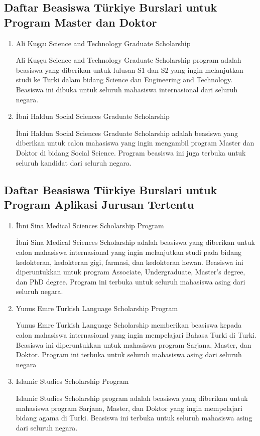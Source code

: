 \subsection{Daftar Beasiswa Türkiye Burslari untuk Program Master dan Doktor}

\begin{enumerate}
\item Ali Kuşçu Science and Technology Graduate Scholarship

Ali Kuşçu Science and Technology Graduate Scholarship program adalah beasiswa yang diberikan untuk lulusan S1 dan S2 yang ingin melanjutkan studi ke Turki dalam bidang Science dan Engineering and Technology. Beasiswa ini dibuka untuk seluruh mahasiswa internasional dari seluruh negara.

\item İbni Haldun Social Sciences Graduate Scholarship

İbni Haldun Social Sciences Graduate Scholarship adalah beasiswa yang diberikan untuk calon mahasiswa yang ingin mengambil program Master dan Doktor di bidang Social Science. Program beasiswa ini juga terbuka untuk seluruh kandidat dari seluruh negara.
\end{enumerate}

\subsection{Daftar Beasiswa Türkiye Burslari untuk Program Aplikasi Jurusan Tertentu}

\begin{enumerate}
\item İbni Sina Medical Sciences Scholarship Program

İbni Sina Medical Sciences Scholarship adalah beasiswa yang diberikan untuk calon mahasiswa internasional yang ingin melanjutkan studi pada bidang kedokteran, kedokteran gigi, farmasi, dan kedokteran hewan. Beasiswa ini diperuntukkan untuk program Associate, Undergraduate, Master’s degree, dan PhD degree. Program ini terbuka untuk seluruh mahasiswa asing dari seluruh negara.

\item Yunus Emre Turkish Language Scholarship Program

Yunus Emre Turkish Language Scholarship memberikan beasiswa kepada calon mahasiswa internasional yang ingin mempelajari Bahasa Turki di Turki. Beasiswa ini diperuntukkan untuk mahasiswa program Sarjana, Master, dan Doktor. Program ini terbuka untuk seluruh mahasiswa asing dari seluruh negara

\item Islamic Studies Scholarship Program

Islamic Studies Scholarship program adalah beasiswa yang diberikan untuk mahasiswa program Sarjana, Master, dan Doktor yang ingin mempelajari bidang agama di Turki. Beasiswa ini terbuka untuk seluruh mahasiswa asing dari seluruh negara.
\end{enumerate}
 
